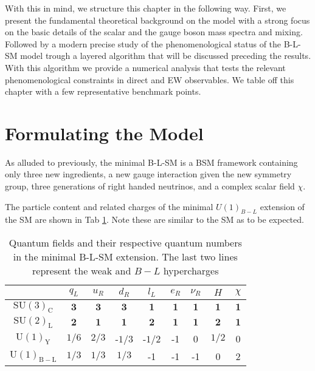 With this in mind, we structure this chapter in the following way. First, we present the fundamental theoretical background on the model with a strong focus on the basic details of the scalar and the gauge boson mass spectra and mixing. Followed by a modern precise study of the phenomenological status of the B-L-SM model trough a layered algorithm that will be discussed preceding the results. With this algorithm we provide a numerical analysis that tests the relevant phenomenological constraints in direct and EW observables. We table off this chapter with a few representative benchmark points. 


\section{Formulating the Model}

As alluded to previously, the minimal B-L-SM is a BSM framework containing only three new ingredients, a new gauge interaction given the new symmetry group, three generations of right handed neutrinos, and a complex scalar field $\chi$. 

The particle content and related charges of the minimal $U(1)_{B-L}$ extension of the SM are shown in Tab \ref{tab:BLSM_Charges}. Note these are similar to the SM as to be expected. 
%
\begin{table}[H]
	\centering
	\begin{tabular}{|c|c|c|c|c|c|c|c|c|}
		\hline
		& $q_L$  & $u_R$ & $d_R$ & $l_L$  & $e_R$ & $\nu_R$  &  $H$  & $\chi$  \\ \hline
		$\mathrm{SU(3)_C}$& $\mathbf{3}$ & $\mathbf{3}$  & $\mathbf{3}$  & $\mathbf{1}$  & $\mathbf{1}$   & $\mathbf{1}$   & $\mathbf{1}$    & $\mathbf{1}$    \\
		$\mathrm{SU(2)_L}$& $\mathbf{2}$  & $\mathbf{1}$ & $\mathbf{1}$ & $\mathbf{2}$ & $\mathbf{1}$ & $\mathbf{1}$ & $\mathbf{2}$  & $\mathbf{1}$ \\
		$\mathrm{U(1)_Y}$ & ${1}/{6}$ & ${2}/{3}$  & -${1}/{3}$  & -${1}/{2}$ & -1 & 0 & ${1}/{2}$ & 0 \\
		$\mathrm{U(1)_{B-L}}$ & ${1}/{3}$ & ${1}/{3}$ & ${1}/{3}$  & -1  & -1 &-1  & 0 & 2  \\ \hline 
	\end{tabular}
	\caption{Quantum fields and their respective quantum numbers in the minimal B-L-SM extension. The last two lines represent the weak and $B-L$ hypercharges}
	\label{tab:BLSM_Charges}
\end{table} 


